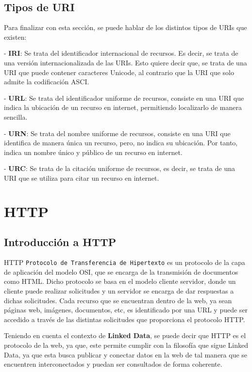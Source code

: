 \documentclass[11pt]{report}
\begin{document}
\section{Tipos de URI}

Para finalizar con esta sección, se puede hablar de los distintos tipos de URIs que existen:

- \textbf{IRI}: Se trata del identificador internacional de recursos. Es decir, se trata de una versión internacionalizada de las URIs. Esto quiere decir que, se trata de una URI que puede contener caracteres Unicode, al contrario que la URI que solo admite la codificación ASCI.

- \textbf{URL}: Se trata del identificador uniforme de recursos, consiste en una URI que indica la ubicación de un recurso en internet, permitiendo localizarlo de manera sencilla.

- \textbf{URN}: Se trata del nombre uniforme de recursos, consiste en una URI que identifica de manera única un recurso, pero, no indica su ubicación. Por tanto, indica un nombre único y público de un recurso en internet.

- \textbf{URC}: Se trata de la citación uniforme de recursos, es decir, se trata de una URI que se utiliza para citar un recurso en internet.

\chapter{HTTP}

\section{Introducción a HTTP}

HTTP \texttt{Protocolo de Transferencia de Hipertexto} es un protocolo de la capa de aplicación del modelo OSI, que se encarga de la transmisión de documentos como HTML.  Dicho protocolo se basa en el modelo cliente servidor, donde un cliente puede realizar solicitudes y un servidor se encarga de dar respuestas a dichas solicitudes. Cada recurso que se encuentran dentro de la web, ya sean páginas web, imágenes, documentos, etc, es identificado por una URL y puede ser accedido a través de las distintas solicitudes que proporciona el protocolo HTTP.

Teniendo en cuenta el contexto de \textbf{Linked Data}, se puede decir que HTTP es el protocolo de la web, ya que, este permite cumplir con la filosofía que sigue Linked Data, ya que esta busca publicar y conectar datos en la web de tal manera que se encuentren interconectados y puedan ser consultados de forma coherente.
\end{document}

